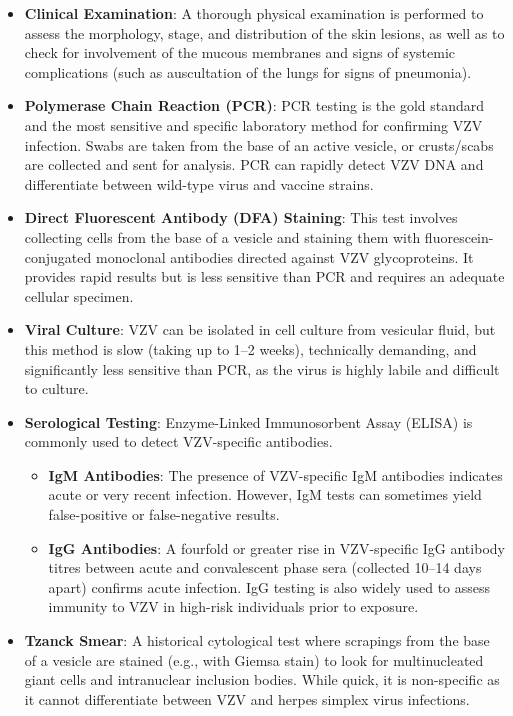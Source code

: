 \begin{itemize}
    \item \textbf{Clinical Examination}: A thorough physical examination is performed to assess the morphology, stage, and distribution of the skin lesions, as well as to check for involvement of the mucous membranes and signs of systemic complications (such as auscultation of the lungs for signs of pneumonia).
    \item \textbf{Polymerase Chain Reaction (PCR)}: PCR testing is the gold standard and the most sensitive and specific laboratory method for confirming VZV infection. Swabs are taken from the base of an active vesicle, or crusts/scabs are collected and sent for analysis. PCR can rapidly detect VZV DNA and differentiate between wild-type virus and vaccine strains.
    \item \textbf{Direct Fluorescent Antibody (DFA) Staining}: This test involves collecting cells from the base of a vesicle and staining them with fluorescein-conjugated monoclonal antibodies directed against VZV glycoproteins. It provides rapid results but is less sensitive than PCR and requires an adequate cellular specimen.
    \item \textbf{Viral Culture}: VZV can be isolated in cell culture from vesicular fluid, but this method is slow (taking up to 1--2 weeks), technically demanding, and significantly less sensitive than PCR, as the virus is highly labile and difficult to culture.
    \item \textbf{Serological Testing}: Enzyme-Linked Immunosorbent Assay (ELISA) is commonly used to detect VZV-specific antibodies.
    \begin{itemize}
        \item \textbf{IgM Antibodies}: The presence of VZV-specific IgM antibodies indicates acute or very recent infection. However, IgM tests can sometimes yield false-positive or false-negative results.
        \item \textbf{IgG Antibodies}: A fourfold or greater rise in VZV-specific IgG antibody titres between acute and convalescent phase sera (collected 10--14 days apart) confirms acute infection. IgG testing is also widely used to assess immunity to VZV in high-risk individuals prior to exposure.
    \end{itemize}
    \item \textbf{Tzanck Smear}: A historical cytological test where scrapings from the base of a vesicle are stained (e.g., with Giemsa stain) to look for multinucleated giant cells and intranuclear inclusion bodies. While quick, it is non-specific as it cannot differentiate between VZV and herpes simplex virus infections.
\end{itemize}

